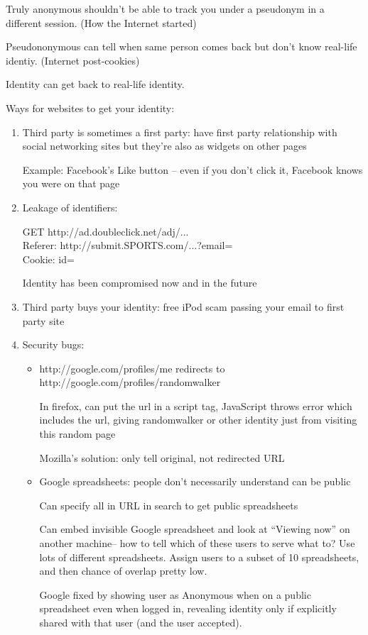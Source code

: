 Truly anonymous shouldn't be able to track you under a pseudonym in a different
session. (How the Internet started)

Pseudononymous can tell when same person comes back but don't know real-life
identiy. (Internet post-cookies)

Identity can get back to real-life identity.

Ways for websites to get your identity:
\begin{enumerate}
    \item Third party is sometimes a first party: have first party relationship
        with social networking sites but they're also as widgets on other pages

        Example: Facebook's Like button -- even if you don't click it, Facebook
        knows you were on that page
    \item Leakage of identifiers:

        \begin{tt}
        GET http://ad.doubleclick.net/adj/...\\
        Referer: http://submit.SPORTS.com/...?email=\color{red}{jdoe@email.com}\\
        Cookie: id=\color{red}{35c192bcfe0000b1...}\\
        \end{tt}

        Identity has been compromised now and in the future
    \item Third party buys your identity: free iPod scam passing your email to
        first party site
    \item Security bugs:
        \begin{itemize}
        \item http://google.com/profiles/me redirects to
            http://google.com/profiles/randomwalker

            In firefox, can put the url in a script tag, JavaScript throws error
            which includes the url, giving randomwalker or other identity just
            from visiting this random page

            Mozilla's solution: only tell original, not redirected URL
        \item Google spreadsheets: people don't necessarily understand can be
            public

            Can specify all in URL in search to get public spreadsheets

            Can embed invisible Google spreadsheet and look at ``Viewing now''
            on another machine-- how to tell which of these users to serve what
            to? Use lots of different spreadsheets. Assign users to a subset of
            10 spreadsheets, and then chance of overlap pretty low.

            Google fixed by showing user as Anonymous when on a public
            spreadsheet even when logged in, revealing identity only if
            explicitly shared with that user (and the user accepted).
        \end{itemize}
\end{enumerate}
